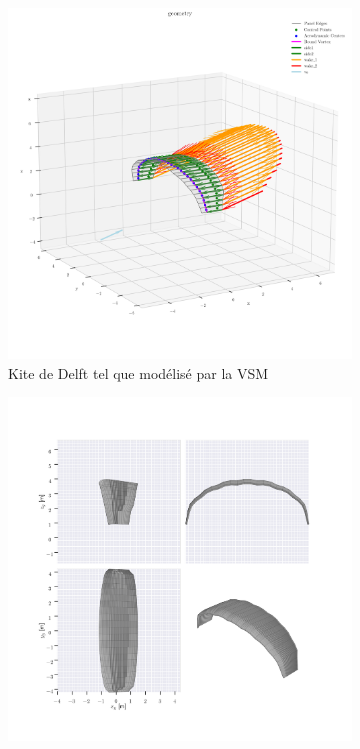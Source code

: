 \documentclass[conference]{IEEEtran}
\begin{document}
\begin{figure}[H]
    \centering
    \begin{subfigure}[b]{0.45\textwidth}
        \centering
        \includegraphics[width=\textwidth]{Pics/kite delft vsm.png}
        \caption{Kite de Delft tel que modélisé par la VSM}
        \label{fig:Kite de Delft tel que modélisé par la VSM}
    \end{subfigure}
    \hfill
    \begin{subfigure}[b]{0.45\textwidth}
        \centering
        \includegraphics[width=\textwidth]{Pics/kite delft vlm.png}

\end{subfigure}
\end{figure}
\end{document}

